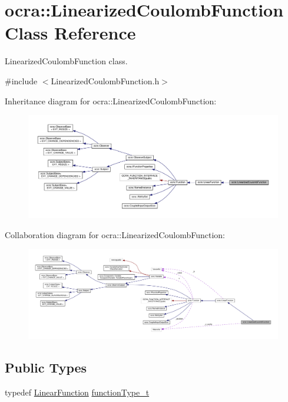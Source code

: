 \hypertarget{classocra_1_1LinearizedCoulombFunction}{}\section{ocra\+:\+:Linearized\+Coulomb\+Function Class Reference}
\label{classocra_1_1LinearizedCoulombFunction}


Linearized\+Coulomb\+Function class.  




{\ttfamily \#include $<$Linearized\+Coulomb\+Function.\+h$>$}



Inheritance diagram for ocra\+:\+:Linearized\+Coulomb\+Function\+:
\nopagebreak
\begin{figure}[H]
\begin{center}
\leavevmode
\includegraphics[width=350pt]{dc/d55/classocra_1_1LinearizedCoulombFunction__inherit__graph}
\end{center}
\end{figure}


Collaboration diagram for ocra\+:\+:Linearized\+Coulomb\+Function\+:
\nopagebreak
\begin{figure}[H]
\begin{center}
\leavevmode
\includegraphics[width=350pt]{d8/d0c/classocra_1_1LinearizedCoulombFunction__coll__graph}
\end{center}
\end{figure}
\subsection*{Public Types}
\begin{DoxyCompactItemize}
\item 
typedef \hyperlink{classocra_1_1LinearFunction}{Linear\+Function} \hyperlink{classocra_1_1LinearizedCoulombFunction_a3b8f1d487a59ea860aee65223cc7c6aa}{function\+Type\+\_\+t}
\end{DoxyCompactItemize}
